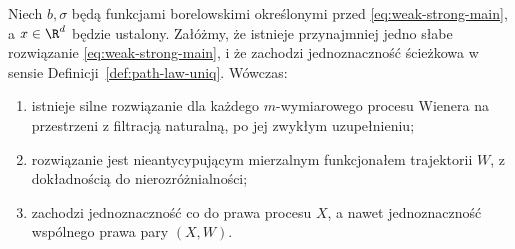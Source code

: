 \begin{twierdzenie}
\label{th:YW}
Niech $b,\sigma$ będą funkcjami borelowskimi określonymi
przed \eqref{eq:weak-strong-main}, a $x\in\R^d$ będzie
ustalony. Załóżmy, że istnieje przynajmniej jedno słabe
rozwiązanie \eqref{eq:weak-strong-main}, i że zachodzi
jednoznaczność ścieżkowa w sensie
Definicji~\ref{def:path-law-uniq}. Wówczas:
\begin{enumerate}
\item istnieje silne rozwiązanie dla każdego $m$-wymiarowego
procesu Wienera na przestrzeni z filtracją naturalną,
po jej zwykłym uzupełnieniu;
\item rozwiązanie jest nieantycypującym mierzalnym funkcjonałem
trajektorii $W$, z dokładnością do nierozróżnialności;
\item zachodzi jednoznaczność co do prawa procesu $X$,
a nawet jednoznaczność wspólnego prawa pary $(X,W)$.
\end{enumerate}
\end{twierdzenie}
